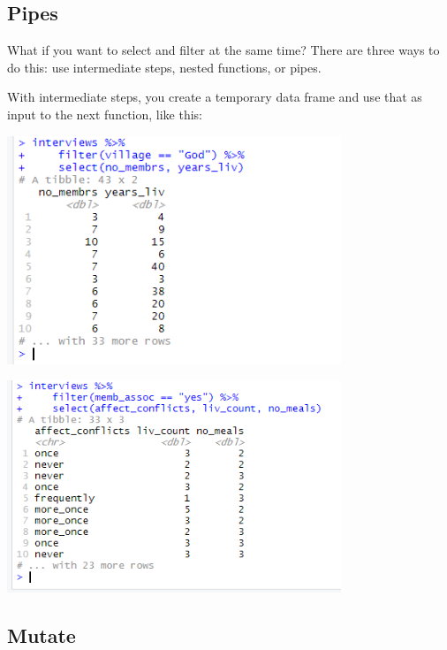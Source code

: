 \documentclass{article}
\begin{document}
\subsection{Pipes}

What if you want to select and filter at the same time? There are three ways to do this: use intermediate steps, nested functions, or pipes.

With intermediate steps, you create a temporary data frame and use that as input to the next function, like this:

\includegraphics[width=10cm]{Images/RStudio035.PNG}

\includegraphics[width=10cm]{Images/RStudio036.PNG}

\subsection{Mutate}
\end{document}
